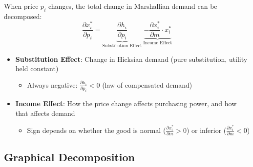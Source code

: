 \documentclass[11pt]{article}
\begin{document}
When price $p_i$ changes, the total change in Marshallian demand can be decomposed:
\[
\boxed{\frac{\partial x_i^*}{\partial p_i} = \underbrace{\frac{\partial h_i}{\partial p_i}}_{\text{Substitution Effect}} \, \underbrace{- \frac{\partial x_i^*}{\partial m} \cdot x_i^*}_{\text{Income Effect}}}
\]

\begin{itemize}
    \item \textbf{Substitution Effect}: Change in Hicksian demand (pure substitution, utility held constant)
    \begin{itemize}
        \item Always negative: $\frac{\partial h_i}{\partial p_i} < 0$ (law of compensated demand)
    \end{itemize}

    \item \textbf{Income Effect}: How the price change affects purchasing power, and how that affects demand
    \begin{itemize}
        \item Sign depends on whether the good is normal ($\frac{\partial x_i^*}{\partial m} > 0$) or inferior ($\frac{\partial x_i^*}{\partial m} < 0$)
    \end{itemize}
\end{itemize}

\subsection{Graphical Decomposition}
\end{document}
